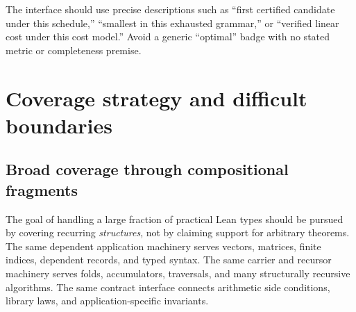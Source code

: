 \documentclass[11pt,letterpaper]{article}
\theoremstyle{definition}
\theoremstyle{remark}
\begin{document}
The interface should use precise descriptions such as ``first certified candidate under this schedule,'' ``smallest in this exhausted grammar,'' or ``verified linear cost under this cost model.'' Avoid a generic ``optimal'' badge with no stated metric or completeness premise.

\section{Coverage strategy and difficult boundaries}
\label{sec:coverage}

\subsection{Broad coverage through compositional fragments}

The goal of handling a large fraction of practical Lean types should be pursued by covering recurring \emph{structures}, not by claiming support for arbitrary theorems. The same dependent application machinery serves vectors, matrices, finite indices, dependent records, and typed syntax. The same carrier and recursor machinery serves folds, accumulators, traversals, and many structurally recursive algorithms. The same contract interface connects arithmetic side conditions, library laws, and application-specific invariants.
\end{document}
